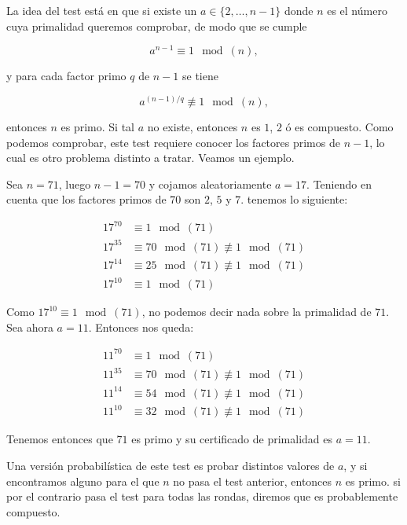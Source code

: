 La idea del test está en que si existe un $a \in \{2,\dotso, n-1\}$ donde $n$ es el número cuya primalidad queremos comprobar, de modo que se cumple

\begin{equation}
a^{n-1} \equiv 1 \mod(n),
\end{equation}

y para cada factor primo $q$ de $n-1$ se tiene

\begin{equation}
a^{(n-1)/q} \not\equiv 1 \mod(n),
\end{equation}

entonces $n$ es primo. Si tal $a$ no existe, entonces $n$ es $1$, $2$ ó es compuesto. Como podemos comprobar, este test requiere conocer los factores primos de $n-1$, lo cual es otro problema distinto a tratar. Veamos un ejemplo.

\begin{ejemplo}
	Sea $n = 71$, luego $n-1 = 70$ y cojamos aleatoriamente $a = 17$. Teniendo en cuenta que los factores primos de $70$ son $2$, $5$ y $7$. tenemos lo siguiente:
	
	\begin{align}
	17^{70} &\equiv 1 \mod(71)\\
	17^{35} &\equiv 70 \mod(71) \not\equiv 1 \mod(71)\\
	17^{14} &\equiv 25 \mod(71) \not\equiv 1 \mod(71)\\
	17^{10} &\equiv 1 \mod(71)
	\end{align}
	
	Como $17^{10} \equiv 1 \mod(71)$, no podemos decir nada sobre la primalidad de $71$. Sea ahora $a = 11$. Entonces nos queda:
	
	\begin{align}
	11^{70} &\equiv 1 \mod(71)\\
	11^{35} &\equiv 70 \mod(71) \not\equiv 1 \mod(71)\\
	11^{14} &\equiv 54 \mod(71) \not\equiv 1 \mod(71)\\
	11^{10} &\equiv 32 \mod(71) \not\equiv 1 \mod(71)
	\end{align}
	
	Tenemos entonces que $71$ es primo y su certificado de primalidad es $a = 11$.
\end{ejemplo}

Una versión probabilística de este test es probar distintos valores de $a$, y si encontramos alguno para el que $n$ no pasa el test anterior, entonces $n$ es primo. si por el contrario pasa el test para todas las rondas, diremos que es probablemente compuesto.\\

